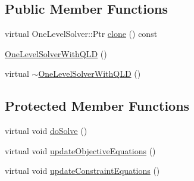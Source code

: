 \subsection*{Public Member Functions}
\begin{DoxyCompactItemize}
\item 
virtual One\+Level\+Solver\+::\+Ptr \hyperlink{classocra_1_1OneLevelSolverWithQLD_a515a99d8834e686e832fb37519aed863}{clone} () const 
\item 
\hyperlink{classocra_1_1OneLevelSolverWithQLD_a75cf75293c527be3cbafb379bcddd758}{One\+Level\+Solver\+With\+Q\+LD} ()
\item 
virtual \hyperlink{classocra_1_1OneLevelSolverWithQLD_aaedebe9fe695e3bca4a9010b88386fcc}{$\sim$\+One\+Level\+Solver\+With\+Q\+LD} ()
\end{DoxyCompactItemize}
\subsection*{Protected Member Functions}
\begin{DoxyCompactItemize}
\item 
virtual void \hyperlink{classocra_1_1OneLevelSolverWithQLD_ac7cce5bd375142ca0c74cd71300b15a5}{do\+Solve} ()
\item 
virtual void \hyperlink{classocra_1_1OneLevelSolverWithQLD_a23556b4af1bdbead4ecb242991dbd175}{update\+Objective\+Equations} ()
\item 
virtual void \hyperlink{classocra_1_1OneLevelSolverWithQLD_abc304c0e5f9234ca4230f7b67b02a0c0}{update\+Constraint\+Equations} ()
\end{DoxyCompactItemize}
